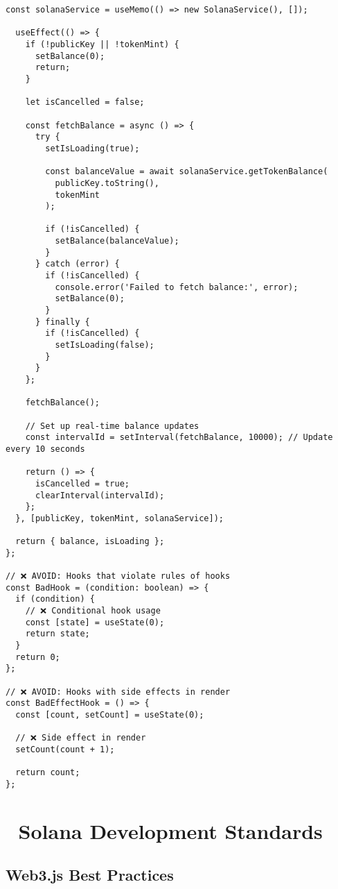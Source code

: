 \documentclass[11pt,a4paper]{article}
\begin{document}
\begin{lstlisting}[style=typescript, caption=Custom Hooks Best Practices]
  const solanaService = useMemo(() => new SolanaService(), []);
  
  useEffect(() => {
    if (!publicKey || !tokenMint) {
      setBalance(0);
      return;
    }
    
    let isCancelled = false;
    
    const fetchBalance = async () => {
      try {
        setIsLoading(true);
        
        const balanceValue = await solanaService.getTokenBalance(
          publicKey.toString(),
          tokenMint
        );
        
        if (!isCancelled) {
          setBalance(balanceValue);
        }
      } catch (error) {
        if (!isCancelled) {
          console.error('Failed to fetch balance:', error);
          setBalance(0);
        }
      } finally {
        if (!isCancelled) {
          setIsLoading(false);
        }
      }
    };
    
    fetchBalance();
    
    // Set up real-time balance updates
    const intervalId = setInterval(fetchBalance, 10000); // Update every 10 seconds
    
    return () => {
      isCancelled = true;
      clearInterval(intervalId);
    };
  }, [publicKey, tokenMint, solanaService]);
  
  return { balance, isLoading };
};

// ❌ AVOID: Hooks that violate rules of hooks
const BadHook = (condition: boolean) => {
  if (condition) {
    // ❌ Conditional hook usage
    const [state] = useState(0);
    return state;
  }
  return 0;
};

// ❌ AVOID: Hooks with side effects in render
const BadEffectHook = () => {
  const [count, setCount] = useState(0);
  
  // ❌ Side effect in render
  setCount(count + 1);
  
  return count;
};
\end{lstlisting}

\section{🔗 Solana Development Standards}

\subsection{Web3.js Best Practices}
\end{document}
